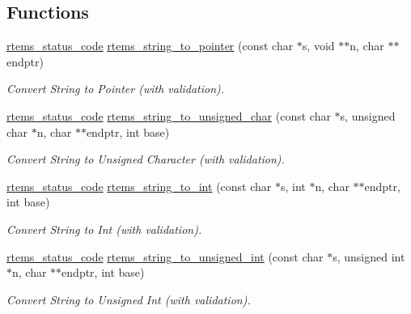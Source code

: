 \subsection*{Functions}
\begin{DoxyCompactItemize}
\item 
\mbox{\hyperlink{group__ClassicStatus_ga545d41846817eaba6143d52ee4d9e9fe}{rtems\+\_\+status\+\_\+code}} \mbox{\hyperlink{group__libmisc__conv__help_gaf5ef6e48a240a3275bd3976048cbb91b}{rtems\+\_\+string\+\_\+to\+\_\+pointer}} (const char $\ast$s, void $\ast$$\ast$n, char $\ast$$\ast$endptr)
\begin{DoxyCompactList}\small\item\em Convert String to Pointer (with validation). \end{DoxyCompactList}\item 
\mbox{\hyperlink{group__ClassicStatus_ga545d41846817eaba6143d52ee4d9e9fe}{rtems\+\_\+status\+\_\+code}} \mbox{\hyperlink{group__libmisc__conv__help_gaaabb1e2234508ec70445684094af151a}{rtems\+\_\+string\+\_\+to\+\_\+unsigned\+\_\+char}} (const char $\ast$s, unsigned char $\ast$n, char $\ast$$\ast$endptr, int base)
\begin{DoxyCompactList}\small\item\em Convert String to Unsigned Character (with validation). \end{DoxyCompactList}\item 
\mbox{\hyperlink{group__ClassicStatus_ga545d41846817eaba6143d52ee4d9e9fe}{rtems\+\_\+status\+\_\+code}} \mbox{\hyperlink{group__libmisc__conv__help_gaa66132944e058bb42bba3ae2bc610939}{rtems\+\_\+string\+\_\+to\+\_\+int}} (const char $\ast$s, int $\ast$n, char $\ast$$\ast$endptr, int base)
\begin{DoxyCompactList}\small\item\em Convert String to Int (with validation). \end{DoxyCompactList}\item 
\mbox{\hyperlink{group__ClassicStatus_ga545d41846817eaba6143d52ee4d9e9fe}{rtems\+\_\+status\+\_\+code}} \mbox{\hyperlink{group__libmisc__conv__help_ga1fea71d7fe59fac932ad2fbd5cbb901c}{rtems\+\_\+string\+\_\+to\+\_\+unsigned\+\_\+int}} (const char $\ast$s, unsigned int $\ast$n, char $\ast$$\ast$endptr, int base)
\begin{DoxyCompactList}\small\item\em Convert String to Unsigned Int (with validation). \end{DoxyCompactList}\item 
$$
\end{DoxyCompactItemize}
